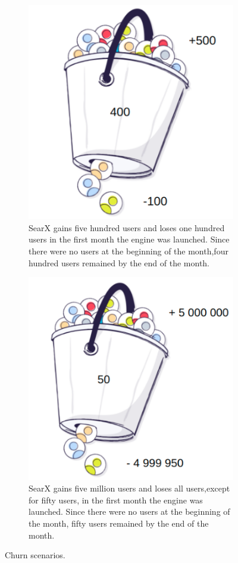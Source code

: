 \documentclass{article}
\begin{document}
\begin{figure}[t]
    \hfill%
    \begin{subfigure}[t]{0.4\linewidth}
        \includegraphics[width=0.8\linewidth]{churn1}
        \caption{SearX‌‌ gains ‌‌five ‌‌hundred‌‌ users‌‌ and‌ ‌loses‌ ‌one‌ ‌hundred‌ ‌users‌ ‌in‌ ‌the‌ ‌first‌‌ month‌ ‌the‌ ‌engine‌ ‌was‌ ‌launched.‌ ‌Since‌‌ there‌ ‌were‌‌ no‌‌ users‌‌ at‌‌ the‌‌ beginning‌‌ of‌‌ the‌‌ month,‌‌four‌‌ hundred‌‌ users‌‌ remained‌‌ by‌‌ the‌‌ end‌ ‌of‌ ‌the‌ ‌month.}
        \label{fig:churn1}
    \end{subfigure}%
    \hfill%
    \begin{subfigure}[t]{0.4\linewidth}
        \includegraphics[width=0.8\linewidth]{churn2}
        \caption{‌‌‌SearX‌ ‌gains‌ ‌five‌ ‌million‌ ‌users‌‌ and‌‌ loses ‌‌all‌‌ users,‌‌except‌‌ for ‌‌fifty‌‌ users, ‌‌in‌‌ the‌ ‌first‌ ‌month‌ ‌the‌ ‌engine‌ ‌was‌ launched.‌‌ Since‌ ‌there‌ ‌were ‌‌no ‌‌users ‌‌at‌‌ the ‌‌beginning‌‌ of‌ ‌the‌ ‌month,‌ ‌fifty‌ ‌users‌ ‌remained‌ ‌by‌ ‌the‌‌ end‌ ‌of‌ ‌the‌ ‌month.}
        \label{fig:churn2}
    \end{subfigure}%
    \hfill%
    \caption{Churn scenarios.}
\end{figure}
\end{document}
